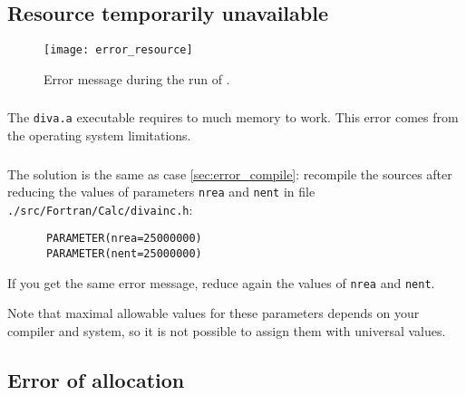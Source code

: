 

\subsection[Resource temporarily unavailable]{Resource temporarily unavailable \label{sec:error_resource}}


\begin{figure}[htpb]
\centering
\texttt{[image: error\_resource]}
\caption{Error message during the run of \label{fig:error_resource}.}
\end{figure}

\subsubsection{\question}

The \texttt{diva.a} executable requires to much memory to work. This error comes from the operating system limitations.


\subsubsection{\answer}

The solution is the same as case \ref{sec:error_compile}: recompile the sources after reducing the values of parameters \texttt{nrea} and \texttt{nent} in file \texttt{./src/Fortran/Calc/divainc.h}:
\begin{verbatim}
      PARAMETER(nrea=25000000)
      PARAMETER(nent=25000000)
\end{verbatim}
If you get the same error message, reduce again the values of \texttt{nrea} and \texttt{nent}.

Note that maximal allowable values for these parameters depends on your compiler and system, so it is not possible to assign them with universal values.



\subsection{Error of allocation \label{sec:error_allocation}}

